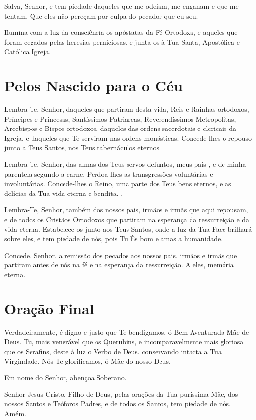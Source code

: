 \documentclass{subfiles}
\begin{document}
Salva, Senhor, e tem piedade daqueles que me odeiam, me enganam e que me tentam.
Que eles não pereçam por culpa do pecador que eu sou. \metanoia{}

Ilumina com a luz da consciência os apóstatas da Fé Ortodoxa, e aqueles que
foram cegados pelas heresias perniciosas, e junta-os à Tua Santa, Apostólica e
Católica Igreja. \metanoia{}

\section*{Pelos Nascido para o Céu}

Lembra-Te, Senhor, daqueles que partiram desta vida, Reis e Rainhas ortodoxos,
Príncipes e Princesas, Santíssimos Patriarcas, Reverendíssimos Metropolitas,
Arcebispos e Bispos ortodoxos, daqueles das ordens sacerdotais e clericais da
Igreja, e daqueles que Te serviram nas ordens monásticas. Concede-lhes o repouso
junto a Teus Santos, nos Teus tabernáculos eternos. \metanoia{}

Lembra-Te, Senhor, das almas dos Teus servos defuntos, meus pais
\dotextit{[nomes]}, e de minha parentela segundo a carne. Perdoa-lhes as
transgressões voluntárias e involuntárias. Concede-lhes o Reino, uma parte dos
Teus bens eternos, e as delícias da Tua vida eterna e bendita. \metanoia{}.

Lembra-Te, Senhor, também dos nossos pais, irmãos e irmãs que aqui repousam, e
de todos os Cristãos Ortodoxos que partiram na esperança da ressurreição e da
vida eterna. Estabelece-os junto aos Teus Santos, onde a luz da Tua Face
brilhará sobre eles, e tem piedade de nós, pois Tu És bom e amas a humanidade.
\metanoia{}

Concede, Senhor, a remissão dos pecados aos nossos pais, irmãos e irmãs que
partiram antes de nós na fé e na esperança da ressurreição. A eles, memória
eterna. \metanoia{}

\section*{Oração Final}

Verdadeiramente, é digno e justo que Te bendigamos, ó Bem-Aventurada Mãe de
Deus. Tu, mais venerável que os Querubins, e incomparavelmente mais gloriosa que
os Serafins, deste à luz o Verbo de Deus, conservando intacta a Tua Virgindade.
Nós Te glorificamos, ó Mãe do nosso Deus.

\Doxology{}

\mercy{} \thrice{}

Em nome do Senhor, abençoa Soberano.

Senhor Jesus Cristo, Filho de Deus, pelas orações da Tua puríssima Mãe, dos
nossos Santos e Teóforos Padres, e de todos os Santos, tem piedade de nós. Amém.
\end{document}
